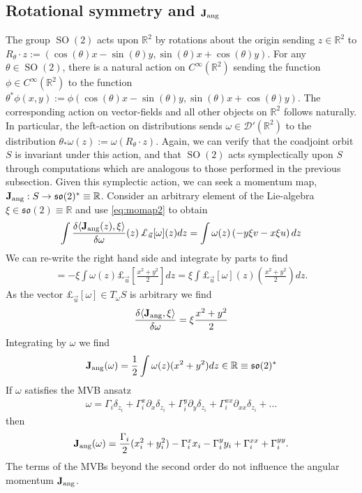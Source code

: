 \documentclass[12pt]{amsart}
\newcommand{\R}{\ensuremath{\mathbb{R}}}
\theoremstyle{remark}
\DeclareMathOperator{\SO}{SO}
\begin{document}
\subsection{Rotational symmetry and ${\bf J}_{\rm ang}$}
The group $\SO(2)$ acts upon $\mathbb{R}^2$ by rotations about the origin sending $z \in \R^2$ to $R_\theta \cdot z := ( \cos(\theta)x-\sin(\theta)y,\sin(\theta)x+\cos(\theta)y )$.
For any $\theta \in \SO(2)$, there is a natural action on $C^{\infty}(\mathbb{R}^2)$ sending the function $\phi \in C^{\infty}(\mathbb{R}^2)$ to the function $\theta^*\phi(x,y) := \phi(\cos(\theta)x-\sin(\theta)y,\sin(\theta)x+\cos(\theta)y)$.  The corresponding action on vector-fields and all other objects on $\mathbb{R}^2$ follows naturally.  
 In particular, the left-action on distributions sends $\omega \in \mathcal{D}'(\mathbb{R}^2)$ to the distribution $\theta_* \omega(z) := \omega( R_\theta \cdot z)$.
Again, we can verify that the coadjoint orbit $S$ is invariant under this action, and that $\SO(2)$ acts symplectically upon $S$
through computations which are analogous to those performed in the previous subsection.
Given this symplectic action, we can seek a momentum map, ${\bf J}_{\rm ang}:S \to \mathfrak{so}(2)^* \equiv \mathbb{R}$.  Consider an arbitrary element of the Lie-algebra $\xi \in \mathfrak{so}(2) \equiv \mathbb{R}$ and use \eqref{eq:momap2} to obtain
\begin{align*}
  \int  \frac{\delta  \langle {\bf J}_{\rm ang} (z) , \xi \rangle }{\delta \omega} (z) \, \pounds_{\vec{u}}[\omega] (z) dz
  = \int \omega(z) \left( -y\xi v - x\xi u \right) dz
\end{align*}
We can re-write the right hand side and integrate by parts to find
\begin{align*}
  = -\xi \int \omega(z) \pounds_{\vec{u}} \left[\frac{x^2+y^2}{2}\right] dz
  = \xi \int \pounds_{\vec{u}}[\omega](z) \left( \frac{x^2+y^2}{2} \right) dz.
\end{align*}
As the vector $\pounds_{\vec{u}}[\omega] \in T_\omega S$ is arbitrary we find
\begin{align*}
  \frac{\delta \langle {\bf J}_{\rm ang} , \xi \rangle}{\delta \omega} = \xi \frac{x^2+y^2}{2}
\end{align*}
Integrating by $\omega$ we find
\begin{align*}
    {\bf J}_{\rm ang}(\omega) = \frac{1}{2}\int \omega(z) ( x^2 + y^2) dz \in \mathbb{R} \equiv \mathfrak{so}(2)^*
\end{align*}
If $\omega$ satisfies the MVB ansatz
\begin{align*}
  \omega = \Gamma_i \delta_{z_i} + \Gamma_i^x \partial_x \delta_{z_i} + \Gamma_i^y \partial_y \delta_{z_i} + \Gamma_i^{xx} \partial_{xx} \delta_{z_i} + \dots
\end{align*}
then
\begin{align*}
  {\bf J}_{\rm ang}(\omega) = \frac{\Gamma_i}{2} (x_i^2 + y_i^2) - \Gamma_i^x x_i - \Gamma_i^y y_i + \Gamma_i^{xx} + \Gamma_i^{yy} .
\end{align*}
The terms of the MVBs beyond the second order do not influence the angular momentum ${\bf J}_{\rm ang}$.
\end{document}
